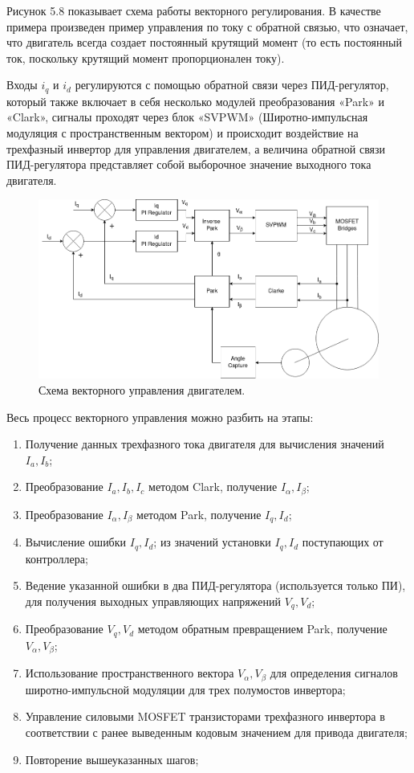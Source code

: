 Рисунок 5.8 показывает схема работы векторного регулирования. В качестве примера произведен пример управления по току с обратной связью, что означает, что двигатель всегда создает постоянный крутящий момент (то есть постоянный ток, поскольку крутящий момент пропорционален току).

Входы $i_q$ и $i_d$ регулируются с помощью обратной связи через ПИД-регулятор, который также включает в себя несколько модулей преобразования «Park» и «Clark», сигналы проходят через блок «SVPWM» \citep{Ananth2012} (Широтно-импульсная модуляция с пространственным вектором) и происходит воздействие на трехфазный инвертор для управления двигателем, а величина обратной связи ПИД-регулятора представляет собой выборочное значение выходного тока двигателя.

\begin{figure}[H]
	\centering
	\includegraphics[width=\textwidth]{Src/images/FOC maindrawio.png}
	\caption{Схема векторного управления двигателем.}
	\label{ACDFOCALG}
\end{figure}


Весь процесс векторного управления можно разбить на этапы:
\begin{enumerate}
	\item Получение данных трехфазного тока двигателя для вычисления значений $I_a,I_b$;
	\item Преобразование $I_a,I_b,I_c$ методом Clark, получение $I_\alpha,I_\beta$;
	\item Преобразование $I_\alpha,I_\beta$ методом Park, получение $I_q,I_d$;
	\item Вычисление ошибки $I_q,I_d$; из значений установки $I_q,I_d$ поступающих от контроллера;
	\item Ведение указанной ошибки в два ПИД-регулятора (используется только ПИ), для получения выходных управляющих напряжений $V_q,V_d$;
	\item Преобразование $V_q,V_d$ методом обратным превращением Park, получение $V_\alpha,V_\beta$;
	\item Использование пространственного вектора $V_\alpha,V_\beta$ для определения сигналов широтно-импульсной модуляции для трех полумостов инвертора;
	\item Управление силовыми MOSFET транзисторами трехфазного инвертора в соответствии с ранее выведенным кодовым значением для привода двигателя;
	\item Повторение вышеуказанных шагов;
\end{enumerate}

